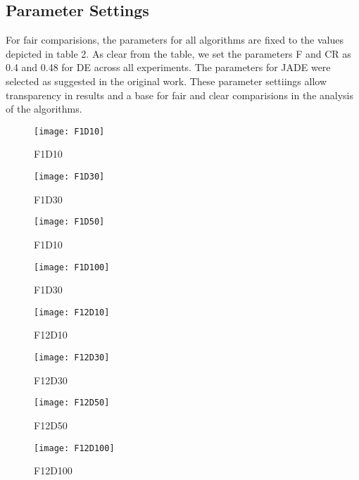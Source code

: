 \subsection{Parameter Settings}


For fair comparisions, the parameters for all algorithms are fixed to the values depicted in table 2. As clear from the table, we set the parameters F and CR as 0.4 and 0.48 for DE across all experiments. The parameters for JADE were selected as suggested in the original work. These parameter settiings allow transparency in results and a base for fair and clear comparisions in the analysis of the algorithms.




\begin{figure*}[h!]
    \centering
    \begin{subfigure}[b]{0.24\textwidth}
        \texttt{[image: F1D10]}
        \caption{F1D10}
    \end{subfigure}
    \begin{subfigure}[b]{0.24\textwidth}
        \texttt{[image: F1D30]}
        \caption{F1D30}
    \end{subfigure}    
    \begin{subfigure}[b]{0.24\textwidth}
        \texttt{[image: F1D50]}
        \caption{F1D10}
    \end{subfigure}
    \begin{subfigure}[b]{0.24\textwidth}
        \texttt{[image: F1D100]}
        \caption{F1D30}
    \end{subfigure}

    \begin{subfigure}[b]{0.24\textwidth}
        \texttt{[image: F12D10]}
        \caption{F12D10}
    \end{subfigure}
    \begin{subfigure}[b]{0.24\textwidth}
        \texttt{[image: F12D30]}
        \caption{F12D30}
    \end{subfigure}        
    \begin{subfigure}[b]{0.24\textwidth}
        \texttt{[image: F12D50]}
        \caption{F12D50}
    \end{subfigure}
    \begin{subfigure}[b]{0.24\textwidth}
        \texttt{[image: F12D100]}
        \caption{F12D100}
    \end{subfigure}


\end{figure*}
